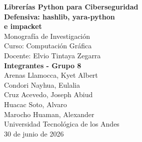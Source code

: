 \documentclass[12pt,a4paper]{article}
\title{}
\author{}
\date{}
\begin{document}
\begin{titlepage}
\thispagestyle{empty}
\begin{center}
\vspace*{4cm}

{\LARGE \textbf{Librerías Python para Ciberseguridad}}\\[8pt]
{\LARGE \textbf{Defensiva: hashlib, yara-python}}\\[8pt]
{\LARGE \textbf{e impacket}}\\[24pt]

{\large Monografía de Investigación}\\[12pt]
{\large Curso: Computación Gráfica}\\[12pt]
{\large Docente: Elvio Tintaya Zegarra}\\[36pt]

{\large \textbf{Integrantes - Grupo 8}}\\[12pt]
{\large Arenas Llamocca, Kyet Albert}\\[4pt]
{\large Condori Nayhua, Eulalia}\\[4pt]
{\large Cruz Acevedo, Joseph Abiud}\\[4pt]
{\large Huacac Soto, Alvaro}\\[4pt]
{\large Marocho Huaman, Alexander}\\[24pt]

{\large Universidad Tecnológica de los Andes}\\[24pt]

{\large 30 de junio de 2026}

\end{center}
\end{titlepage}
\end{document}
